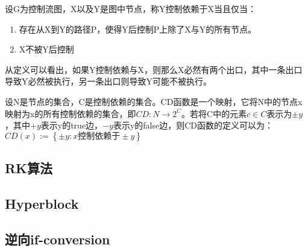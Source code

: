\begin{definition}
设G为控制流图，X以及Y是图中节点，称Y控制依赖于X当且仅当：
\begin{enumerate}
\item 存在从X到Y的路径P，使得Y后控制P上除了X与Y的所有节点。
\item X不被Y后控制
\end{enumerate}
\end{definition}
从定义可以看出，如果Y控制依赖与X，则那么X必然有两个出口，其中一条出口导致Y必然被执行，另一条出口则导致Y可能不被执行。

\begin{definition}[CD函数]
设N是节点的集合，C是控制依赖的集合。CD函数是一个映射，它将N中的节点x映射为x的所有控制依赖的集合，即$CD:N\to 2^C$。若将C中的元素$c\in C$表示为$\pm y$，其中$+y$表示y的true边，$-y$表示y的false边，则CD函数的定义可以为：$CD\left(x\right):=\left\{\pm y:x\text{控制依赖于}\pm y\right\}$
\end{definition}

\subsection{RK算法}
\subsection{Hyperblock}
\subsection{逆向if-conversion}